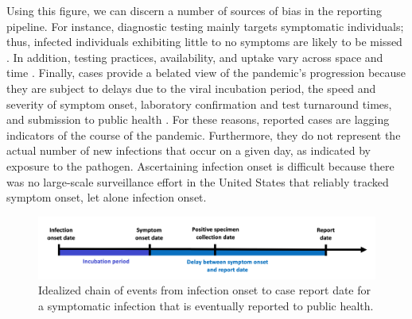 \documentclass{article}
\begin{document}
Using this figure, we can discern a number of sources of bias in the reporting
pipeline. For instance, diagnostic testing mainly targets symptomatic
individuals; thus, infected individuals exhibiting little to no symptoms are
likely to be missed \citep{cdc2022estimated}. In addition, testing practices,
availability, and uptake vary across space and time \citep{pitzer2021impact,
ecdc2020strategies, hitchings2021usefulness}. Finally, cases provide a belated
view of the pandemic's progression because they are subject to delays due to the
viral incubation period, the speed and severity of symptom onset, laboratory
confirmation and test turnaround times, and submission to public health
\citep{pellis2021challenges, wash2020dash}. For these reasons, reported cases
are lagging indicators of the course of the pandemic. Furthermore, they do not
represent the actual number of new infections that occur on a given day, as
indicated by exposure to the pathogen. Ascertaining infection onset is difficult
because there was no large-scale surveillance effort in the United States that
reliably tracked symptom onset, let alone infection onset.

\begin{figure}[!tb]
\centering
    \includegraphics[width=.99\textwidth]{Chain_of_events_onset_report.pdf} 
    \caption{Idealized chain of events from infection onset to case report date 
    for a symptomatic infection that is eventually reported to public health.}
    \label{fig:chain_events_onset_report}
\end{figure}

\end{document}
